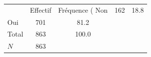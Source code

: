 {
\def\sym#1{\ifmmode^{#1}\else\(^{#1}\)\fi}
\begin{tabular}{l*{1}{cc}}
\toprule
            &    Effectif&Fréquence (%
\midrule
Non         &         162&        18.8\\
Oui         &         701&        81.2\\
Total       &         863&       100.0\\
\midrule
\(N\)       &         863&            \\
\bottomrule
\end{tabular}
}

